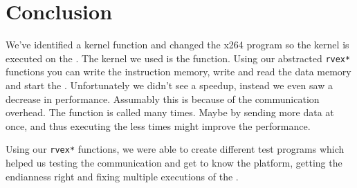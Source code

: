 \section{Conclusion}

We've identified a kernel function and changed the x264 program so the kernel
is executed on the \rvex. The kernel we used is the \satd function. Using our
abstracted \texttt{rvex*} functions you can write the instruction memory, write
and read the data memory and start the \rvex. Unfortunately we didn't see a
speedup, instead we even saw a decrease in performance. Assumably this is
because of the communication overhead. The \satd function is called many times.
Maybe by sending more data at once, and thus executing the \rvex less times
might improve the performance.

Using our \texttt{rvex*} functions, we were able to create different test
programs which helped us testing the communication and get to know the
platform, getting the endianness right and fixing multiple executions of the
\rvex.

